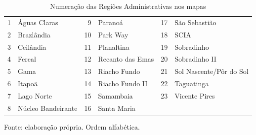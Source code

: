 \begin{table}[htbp]
\centering
\caption{Numeração das Regiões Administrativas nos mapas}\label{tab:num_ras}
\begin{tabular}{r l r l r l}
\hline
1 & Águas Claras & 9 & Paranoá & 17 & São Sebastião \\
2 & Brazlândia & 10 & Park Way & 18 & SCIA \\
3 & Ceilândia & 11 & Planaltina & 19 & Sobradinho \\
4 & Fercal & 12 & Recanto das Emas & 20 & Sobradinho II \\
5 & Gama & 13 & Riacho Fundo & 21 & Sol Nascente/Pôr do Sol \\
6 & Itapoã & 14 & Riacho Fundo II & 22 & Taguatinga \\
7 & Lago Norte & 15 & Samambaia & 23 & Vicente Pires \\
8 & Núcleo Bandeirante & 16 & Santa Maria &  &  \\
\hline
\end{tabular}
\par\footnotesize Fonte: elaboração própria. Ordem alfabética.
\end{table}
